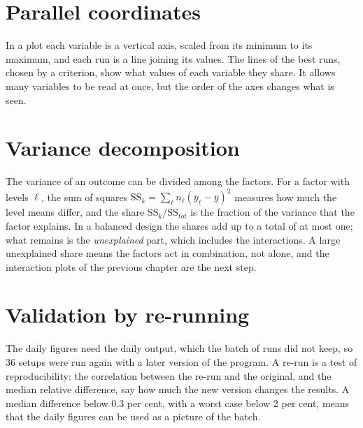 \section{Parallel coordinates}
In a  plot each variable is a vertical axis, scaled from its minimum to its maximum, and each run is a line joining its values. The lines of the best runs, chosen by a criterion, show what values of each variable they share. It allows many variables to be read at once, but the order of the axes changes what is seen.

\section{Variance decomposition}
The variance of an outcome can be divided among the factors. For a factor with levels $\ell$, the sum of squares $\mathrm{SS}_k=\sum_\ell n_\ell(\bar y_\ell-\bar y)^2$ measures how much the level means differ, and the share $\mathrm{SS}_k/\mathrm{SS}_{tot}$ is the fraction of the variance that the factor explains. In a balanced design the shares add up to a total of at most one; what remains is the \emph{unexplained} part, which includes the interactions. A large unexplained share means the factors act in combination, not alone, and the interaction plots of the previous chapter are the next step.

\section{Validation by re-running}
The daily figures need the daily output, which the batch of runs did not keep, so 36 setups were run again with a later version of the program. A re-run is a test of reproducibility: the correlation between the re-run and the original, and the median relative difference, say how much the new version changes the results. A median difference below 0.3 per cent, with a worst case below 2 per cent, means that the daily figures can be used as a picture of the batch.
